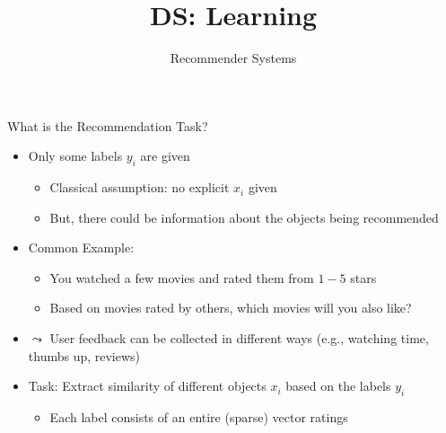 \documentclass[aspectratio=169]{../latex_main/tntbeamer}  %
\title[Recommender Systems]{DS: Learning}
\subtitle{Recommender Systems}
\begin{document}
	
    \maketitle
    
    \begin{frame}{What is the Recommendation Task?}
        \vspace{-1em}
        \begin{itemize}
            \item Only some labels $y_i$ are given
            \begin{itemize}
                \item Classical assumption: no explicit $x_i$ given
                \item But, there could be information about the objects being recommended
            \end{itemize}
            \item Common Example:
            \begin{itemize}
                \item You watched a few movies and rated them from $1-5$ stars
                \item Based on movies rated by others, which movies will you also like?
            \end{itemize}
            \item $\leadsto$ User feedback can be collected in different ways (e.g., watching time, thumbs up, reviews)
            \item \alert{Task}: Extract similarity of different objects $x_i$ based on the labels $y_i$
            \begin{itemize}
                \item Each label consists of an entire (sparse) vector ratings
            \end{itemize}
        \end{itemize}

    \end{frame}
\end{document}
